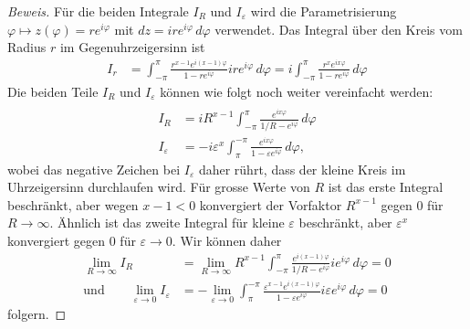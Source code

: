 \begin{proof}[Beweis]
Für die beiden Integrale $I_R$ und $I_\varepsilon$ wird die Parametrisierung
$\varphi\mapsto z(\varphi) = re^{i\varphi}$ mit $dz=ire^{i\varphi}\,d\varphi$
verwendet.
Das Integral über den Kreis vom Radius $r$ im Gegenuhrzeigersinn ist
\begin{align*}
I_r
&=
\int_{-\pi}^\pi
\frac{r^{x-1}e^{i(x-1)\varphi}}{1-re^{i\varphi}} ire^{i\varphi}\,d\varphi
=
i\int_{-\pi}^\pi
\frac{r^xe^{ix\varphi}}{1-re^{i\varphi}}
\,d\varphi
\end{align*}
Die beiden Teile $I_R$ und $I_\varepsilon$ können wie folgt noch
weiter vereinfacht werden:
\begin{align*}
\\
I_R
&=
iR^{x-1}
\int_{-\pi}^\pi
\frac{e^{ix\varphi}}{1/R-e^{i\varphi}}
\,d\varphi
\\
I_{\varepsilon}
&=
-
i
\varepsilon^x
\int_{\pi}^{-\pi}
\frac{e^{ix\varphi}}{1-\varepsilon e^{i\varphi}}
\,d\varphi,
\end{align*}
wobei das negative Zeichen bei $I_\varepsilon$ daher rührt, dass der
kleine Kreis im Uhrzeigersinn durchlaufen wird.
Für grosse Werte von $R$ ist das erste Integral beschränkt, aber wegen
$x-1<0$ konvergiert der Vorfaktor $R^{x-1}$ gegen 0 für $R\to\infty$.
Ähnlich ist das zweite Integral für kleine $\varepsilon$ beschränkt, aber
$\varepsilon^x$ konvergiert gegen $0$ für  $\varepsilon\to 0$.
Wir können daher
\begin{align*}
\lim_{R\to\infty}
I_R
&=
\lim_{R\to\infty}
R^{x-1}
\int_{-\pi}^\pi
\frac{e^{i(x-1)\varphi}}{1/R-e^{i\varphi}}
ie^{i\varphi}
\,d\varphi
=0
\\
\text{und}
\qquad
\lim_{\varepsilon\to 0}
I_\varepsilon
&=
-
\lim_{\varepsilon\to 0}
\int_{\pi}^{-\pi}
\frac{\varepsilon^{x-1}e^{i(x-1)\varphi}}{1-\varepsilon e^{i\varphi}}
i\varepsilon e^{i\varphi}
\,d\varphi
=
0
\end{align*}
folgern.


\end{proof}
